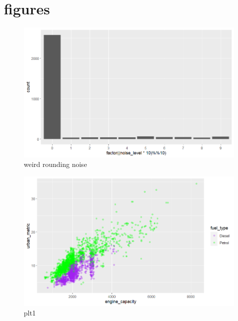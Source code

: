 \documentclass{article}
\begin{document}
\section{figures}

\begin{figure}[h!]
        \centering
        \includegraphics[width=1.1\textwidth]{../plots/afronding noise.png}
        \caption{weird rounding noise}
        \label{fig:rounding}
\end{figure}


\begin{figure}[h!]
        \centering
        \includegraphics[width=1.1\textwidth]{../plots/plt1.png}
        \caption{plt1}
        \label{fig:plt1}
\end{figure}
\end{document}
